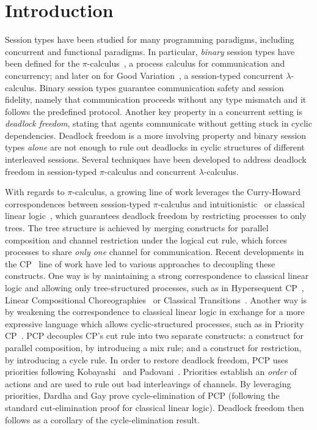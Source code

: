 \documentclass[main.tex]{subfiles}
\begin{document}
\section{Introduction}
Session types have been studied for many programming paradigms, including concurrent and functional paradigms. In particular, \emph{binary} session types have been defined for the $\pi$-calculus~\cite{honda93,takeuchihonda94,hondavasconcelos98}, a process calculus for communication and concurrency; and later on for Good Variation~\cite[GV]{wadler15,lindleymorris15}, a session-typed concurrent $\lambda$-calculus.
Binary session types guarantee communication safety and session fidelity, namely that communication proceeds without any type mismatch and it follows the predefined protocol.
Another key property in a concurrent setting is \emph{deadlock freedom}, stating that agents communicate without getting stuck in cyclic dependencies. Deadlock freedom is a more involving property and binary session types \emph{alone} are not enough to rule out deadlocks in cyclic structures of different interleaved sessions. Several techniques have been developed to address deadlock freedom in session-typed $\pi$-calculus and concurrent $\lambda$-calculus.

With regards to $\pi$-calculus, a growing line of work leverages the Curry-Howard correspondences between session-typed $\pi$-calculus and intuitionistic~\cite{cairespfenning10} or classical linear logic~\cite{wadler14}, which guarantees deadlock freedom by restricting processes to only trees. The tree structure is achieved by merging constructs for parallel composition and channel restriction under the logical cut rule, which forces processes to share \emph{only one} channel for communication.
Recent developments in the CP~\cite{wadler14} line of work have led to various approaches to decoupling these constructs. One way is by maintaining a strong correspondence to classical linear logic and allowing only tree-structured processes, such as in Hypersequent CP~\cite[HCP]{kokkemontesi19popl,kokkemontesi19tlla}, Linear Compositional Choreographies~\cite[LCC]{CarboneMS18} or Classical Transitions~\cite[CT]{MP18}. Another way is by weakening the correspondence to classical linear logic in exchange for a more expressive language which allows cyclic-structured processes, such as in Priority CP~\cite[PCP]{dardhagay18}. PCP decouples CP's cut rule into two separate constructs: a construct for parallel composition, by introducing a mix rule; and a construct for restriction, by introducing a cycle rule. In order to restore deadlock freedom, PCP uses priorities following Kobayashi~\cite{kobayashi06} and Padovani~\cite{padovani14}. Priorities establish an \emph{order} of actions and are used to rule out bad interleavings of channels. By leveraging priorities, Dardha and Gay prove cycle-elimination of PCP (following the standard cut-elimination proof for classical linear logic). Deadlock freedom then follows as a corollary of the cycle-elimination result.
\end{document}
